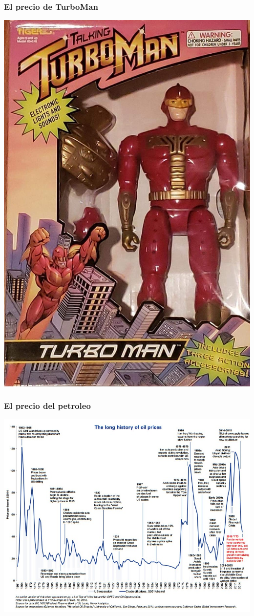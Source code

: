\documentclass{beamer}
\begin{document}
\begin{frame}
\frametitle{ El precio de TurboMan}
\centering
\href{https://www.youtube.com/watch?v=UIBRtxVG_LE&list=PL1Sd7Ozmz5CcoC_5lrL0pLKYXXLOLUhd2&index=12}{\includegraphics[scale=0.1]{Figures/Tema_04.01_Turboman.jpg}}
\end{frame}

\begin{frame}
\frametitle{ El precio del petroleo}
\centering
\includegraphics[scale=0.35]{Figures/Tema_04.01_new.jpg}
\end{frame} 
\end{document}
